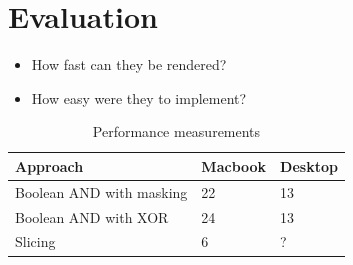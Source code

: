 \documentclass{article}
\begin{document}
\section{Evaluation}

\begin{itemize}
  \item How fast can they be rendered?
  \item How easy were they to implement?
\end{itemize}

\begin{table}
  \centering
  \begin{tabular}{ l l l }
    \toprule
    Approach & Macbook & Desktop \\
    \midrule
    Boolean AND with masking & 22 & 13 \\
    Boolean AND with XOR & 24 & 13 \\
    Slicing & 6 & ? \\
    \bottomrule
  \end{tabular}
  \caption{Performance measurements}
  \label{performance-table}
\end{table}


\newpage


\end{document}
